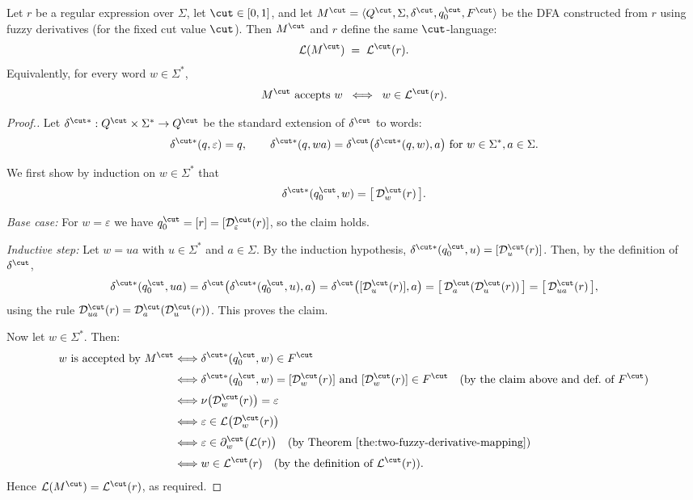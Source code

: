 \begin{theorem}\label{the:fuzzy-dfa-correctness}
Let $r$ be a regular expression over $\Sigma$, let $\cut \in [0,1]$, and let
$M^\cut = \langle Q^\cut, \Sigma, \delta^\cut, q_0^\cut, F^\cut \rangle$
be the DFA constructed from $r$ using fuzzy derivatives (for the fixed cut
value $\cut$).
Then $M^\cut$ and $r$ define the same $\cut$-language:
\[
  \mathcal{L}(M^\cut) \;=\; \mathcal{L}^\cut(r).
\]
Equivalently, for every word $w \in \Sigma^*$,
\[
  M^\cut \text{ accepts } w
  \;\;\Longleftrightarrow\;\;
  w \in \mathcal{L}^\cut(r).
\]
\end{theorem}

\begin{proof}[Proof.]
Let $\delta^{\cut *} : Q^\cut \times \Sigma^* \to Q^\cut$ be the standard
extension of $\delta^\cut$ to words:
\[
  \delta^{\cut *}(q,\varepsilon) = q,
  \qquad
  \delta^{\cut *}(q,wa) = \delta^\cut\bigl(\delta^{\cut *}(q,w),a\bigr)
  \text{ for } w \in \Sigma^*, a \in \Sigma.
\]

We first show by induction on $w \in \Sigma^*$ that
\[
  \delta^{\cut *}(q_0^\cut,w) = \bigl[\,\mathcal{D}^\cut_w(r)\,\bigr].
\]

\emph{Base case:} For $w = \varepsilon$ we have
$q_0^\cut = [r] = [\mathcal{D}^\cut_\varepsilon(r)]$, so the claim holds.

\emph{Inductive step:} Let $w = ua$ with $u \in \Sigma^*$ and $a \in \Sigma$.
By the induction hypothesis,
$\delta^{\cut *}(q_0^\cut,u) = [\mathcal{D}^\cut_u(r)]$.
Then, by the definition of $\delta^\cut$,
\[
  \delta^{\cut *}(q_0^\cut,ua)
  = \delta^\cut\bigl(\delta^{\cut *}(q_0^\cut,u),a\bigr)
  = \delta^\cut\bigl([\mathcal{D}^\cut_u(r)],a\bigr)
  = \bigl[\,\mathcal{D}^\cut_a(\mathcal{D}^\cut_u(r))\,\bigr]
  = \bigl[\,\mathcal{D}^\cut_{ua}(r)\,\bigr],
\]
using the rule $\mathcal{D}^\cut_{ua}(r) = \mathcal{D}^\cut_a(\mathcal{D}^\cut_u(r))$.
This proves the claim.

Now let $w \in \Sigma^*$. Then:
\[
\begin{aligned}
w \text{ is accepted by } M^\cut
&\Longleftrightarrow \delta^{\cut *}(q_0^\cut,w) \in F^\cut \\[0.5ex]
&\Longleftrightarrow \delta^{\cut *}(q_0^\cut,w) = [\mathcal{D}^\cut_w(r)]
             \text{ and } [\mathcal{D}^\cut_w(r)] \in F^\cut
             \quad\text{(by the claim above and def.\ of $F^\cut$)} \\[0.5ex]
&\Longleftrightarrow \nu\bigl(\mathcal{D}^\cut_w(r)\bigr) = \varepsilon \\[0.5ex]
&\Longleftrightarrow \varepsilon \in \mathcal{L}\bigl(\mathcal{D}^\cut_w(r)\bigr) \\[0.5ex]
&\Longleftrightarrow \varepsilon \in \partial^\cut_w\bigl(\mathcal{L}(r)\bigr)
     \quad\text{(by Theorem~\ref{the:two-fuzzy-derivative-mapping})} \\[0.5ex]
&\Longleftrightarrow w \in \mathcal{L}^\cut(r)
     \quad\text{(by the definition of $\mathcal{L}^\cut(r)$).}
\end{aligned}
\]
Hence $\mathcal{L}(M^\cut) = \mathcal{L}^\cut(r)$, as required.
\end{proof}
